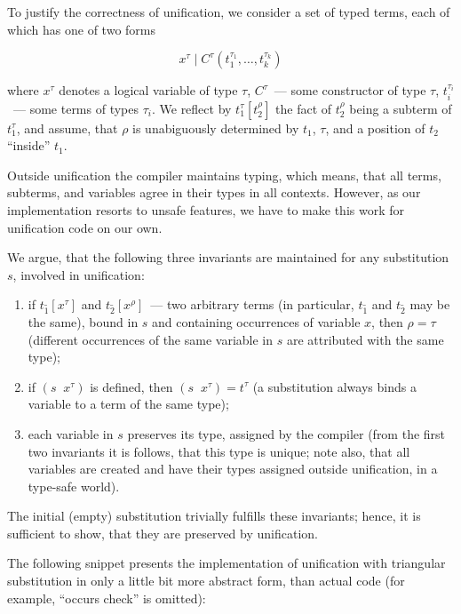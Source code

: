 \documentclass[10pt, oneside, nocopyrightspace]{sigplanconf}
\begin{document}
To justify the correctness of unification, we consider a set of typed terms, each of which
has one of two forms

$$
x^\tau \mid C^\tau(t_1^{\tau_1},\dots,t_k^{\tau_k})
$$

\noindent where $x^\tau$ denotes a logical variable of type $\tau$, 
$C^\tau$~--- some constructor of type $\tau$, $t_i^{\tau_i}$~--- some terms of types $\tau_i$.
We reflect by $t_1^\tau[t_2^\rho]$ the fact of $t_2^\rho$ being a subterm of $t_1^\tau$, and
assume, that $\rho$ is unabiguously determined by $t_1$, $\tau$, and a position of $t_2$ 
``inside'' $t_1$.

Outside unification the compiler maintains typing, which means, that all 
terms, subterms, and variables agree in their types in all contexts. However, as 
our implementation resorts to unsafe features, we have to make this work for unification
code on our own.

We argue, that the following three invariants are maintained for any substitution $s$, involved 
in unification:

\begin{enumerate}
\item if \mbox{$t_1^{\_}[x^{\tau}]$} and \mbox{$t_2^{\_}[x^{\rho}]$}~--- two arbitrary terms (in particular, 
$t_1^{\_}$ and $t_2^{\_}$ may be the same), bound in $s$ and containing occurrences of variable $x$, 
then $\rho=\tau$ (different occurrences of the same variable in $s$ are attributed with the same type);

\item if \mbox{$(s\;\;x^\tau)$} is defined, then \mbox{$(s\;\;x^\tau) = t^\tau$} (a substitution always
binds a variable to a term of the same type);

\item each variable in $s$ preserves its type, assigned by the compiler (from the first two invariants 
it is follows, that this type is unique; note also, that all variables are created and have their 
types assigned outside unification, in a type-safe world).
\end{enumerate}

The initial (empty) substitution trivially fulfills these invariants; hence, it is sufficient
to show, that they are preserved by unification.

The following snippet presents the implementation of unification with triangular 
substitution in only a little bit more abstract form, than actual code (for example, 
``occurs check'' is omitted):
\end{document}
